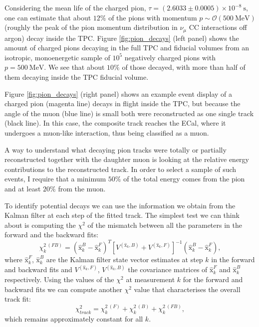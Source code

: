 Considering the mean life of the charged pion, $\tau = (2.6033\pm0.0005)\times10^{-8} \ \mathrm{s}$, one can estimate that about $12\%$ of the pions with momentum $p \sim \mathcal{O}(500 \ \mathrm{MeV})$ (roughly the peak of the pion momentum distribution in $\nu_{\mu}$ CC interactions off argon) decay inside the TPC. Figure \ref{fig:pion_decays} (left panel) shows the amount of charged pions decaying in the full TPC and fiducial volumes from an isotropic, monoenergetic sample of $10^{5}$ negatively charged pions with $p=500 \ \mathrm{MeV}$. We see that about $10\%$ of those decayed, with more than half of them decaying inside the TPC fiducial volume.

Figure \ref{fig:pion_decays} (right panel) shows an example event display of a charged pion (magenta line) decays in flight inside the TPC, but because the angle of the muon (blue line) is small both were reconstructed as one single track (black line). In this case, the composite track reaches the ECal, where it undergoes a muon-like interaction, thus being classified as a muon.

A way to understand what decaying pion tracks were totally or partially reconstructed together with the daughter muon is looking at the relative energy contributions to the reconstructed track. In order to select a sample of such events, I require that a minimum $50\%$ of the total energy comes from the pion and at least $20\%$ from the muon.

To identify potential decays we can use the information we obtain from the Kalman filter at each step of the fitted track. The simplest test we can think about is computing the $\chi^{2}$ of the mismatch between all the parameters in the forward and the backward fits:
\begin{equation}
	\chi^{2 \ (FB)}_{k} = (\hat{\mathrm{x}}^{B}_{k}-\hat{\mathrm{x}}^{F}_{k})^{T}[V^{(\hat{\mathrm{x}}_{k},B)}+V^{(\hat{\mathrm{x}}_{k},F)}]^{-1}(\hat{\mathrm{x}}^{B}_{k}-\hat{\mathrm{x}}^{F}_{k}),
\end{equation}
where $\hat{\mathrm{x}}^{F}_{k}$, $\hat{\mathrm{x}}^{B}_{k}$ are the Kalman filter state vector estimates at step $k$ in the forward and backward fits and $V^{(\hat{\mathrm{x}}_{k},F)}$, $V^{(\hat{\mathrm{x}}_{k},B)}$ the covariance matrices of $\hat{\mathrm{x}}^{F}_{k}$ and $\hat{\mathrm{x}}^{B}_{k}$ respectively. Using the values of the $\chi^{2}$ at measurement $k$ for the forward and backward fits we can compute another $\chi^{2}$ value that characterises the overall track fit:
\begin{equation}
	\chi^{2}_{track} = \chi^{2 \ (F)}_{k} + \chi^{2 \ (B)}_{k} + \chi^{2 \ (FB)}_{k},
\end{equation}
which remains approximately constant for all $k$.

